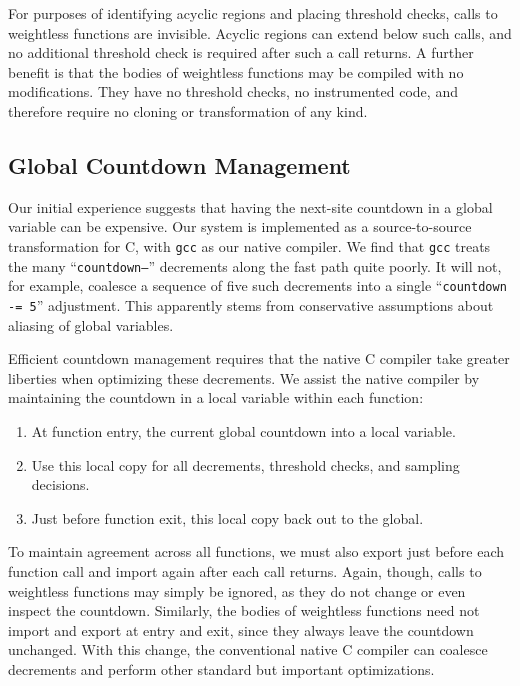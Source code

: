 For purposes of identifying acyclic regions and placing threshold
checks, calls to weightless functions are invisible.  Acyclic regions
can extend below such calls, and no additional threshold check is
required after such a call returns.  A further benefit is that the
bodies of weightless functions may be compiled with no modifications.
They have no threshold checks, no instrumented code, and therefore
require no cloning or transformation of any kind.

\subsection{Global Countdown Management}

Our initial experience suggests that having the next-site countdown in
a global variable can be expensive.  Our system is implemented as a
source-to-source transformation for C, with \texttt{gcc} as our native
compiler.  We find that \texttt{gcc} treats the many
``\texttt{countdown--}'' decrements along the fast path quite poorly.
It will not, for example, coalesce a sequence of five such decrements
into a single ``\texttt{countdown -= 5}'' adjustment.  This apparently
stems from conservative assumptions about aliasing of global
variables.

Efficient countdown management requires that the native C compiler
take greater liberties when optimizing these decrements.  We assist
the native compiler by maintaining the countdown in a local variable
within each function:

\begin{enumerate}
\item At function entry,  the current global countdown
  into a local variable.
\item Use this local copy for all decrements, threshold checks, and
  sampling decisions.
\item Just before function exit,  this local copy back
  out to the global.
\end{enumerate}

To maintain agreement across all functions, we must also
export just before each function call and import again after each call
returns.  Again, though, calls to weightless functions may simply be
ignored, as they do not change or even inspect the countdown.
Similarly, the bodies of weightless functions need not import and
export at entry and exit, since they always leave the countdown
unchanged.  With this change, the conventional native C compiler can
coalesce decrements and perform other standard but important
optimizations.


